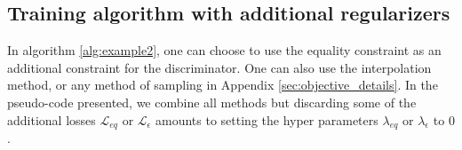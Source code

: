 \documentclass[runningheads]{llncs}
\begin{document}
\subsection{Training algorithm with additional regularizers}
\label{sec:algorithm_details}
In algorithm \ref{alg:example2}, one can choose to use the equality constraint as an additional constraint for the discriminator. One can also use the interpolation method, or any method of sampling in Appendix \ref{sec:objective_details}. In the pseudo-code presented, we combine all methods but discarding some of the additional losses $\mathcal{L}_{eq}$ or $\mathcal{L}_{\epsilon}$ amounts to setting the hyper parameters $\lambda_{eq}$ or $\lambda_\epsilon$ to $0$.
\end{document}
